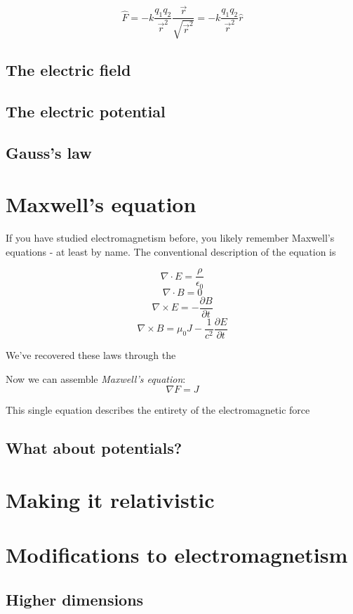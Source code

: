 $$\hat{F} = -k\frac{q_1 q_2}{\vec{r}^2}\frac{\vec{r}}{\sqrt{\vec{r}^2}}
 = -k\frac{q_1 q_2}{\vec{r}^2}\hat{r}$$

\subsection{The electric field}

\subsection{The electric potential}

\subsection{Gauss's law}

\section{Maxwell's equation}

If you have studied electromagnetism before, you likely remember Maxwell's equations - at least by
name. The conventional description of the equation is

$$\nabla \cdot E = \frac{\rho}{\epsilon_0}$$
$$\nabla \cdot B = 0$$
$$\nabla \times E = -\frac{\partial B}{\partial t}$$
$$\nabla \times B = \mu_0 J - \frac{1}{c^2} \frac{\partial E}{\partial t}$$

We've recovered these laws through the 

Now we can assemble \textit{Maxwell's equation}: $$\nabla F = J$$

This single equation describes the entirety of the electromagnetic force

\subsection{What about potentials?}



\section{Making it relativistic}


\section{Modifications to electromagnetism}

\subsection{Higher dimensions}
